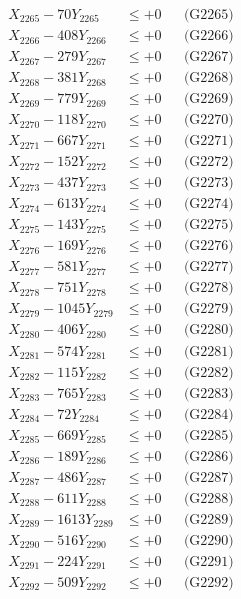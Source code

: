 \documentclass[a4paper,10pt]{article}
\begin{document}
{\begin{align}
X_{2265} - 70Y_{2265} &\leq +0 && \text{(G2265)} \\
X_{2266} - 408Y_{2266} &\leq +0 && \text{(G2266)} \\
X_{2267} - 279Y_{2267} &\leq +0 && \text{(G2267)} \\
X_{2268} - 381Y_{2268} &\leq +0 && \text{(G2268)} \\
X_{2269} - 779Y_{2269} &\leq +0 && \text{(G2269)} \\
X_{2270} - 118Y_{2270} &\leq +0 && \text{(G2270)} \\
\allowbreak
X_{2271} - 667Y_{2271} &\leq +0 && \text{(G2271)} \\
X_{2272} - 152Y_{2272} &\leq +0 && \text{(G2272)} \\
X_{2273} - 437Y_{2273} &\leq +0 && \text{(G2273)} \\
X_{2274} - 613Y_{2274} &\leq +0 && \text{(G2274)} \\
X_{2275} - 143Y_{2275} &\leq +0 && \text{(G2275)} \\
X_{2276} - 169Y_{2276} &\leq +0 && \text{(G2276)} \\
X_{2277} - 581Y_{2277} &\leq +0 && \text{(G2277)} \\
X_{2278} - 751Y_{2278} &\leq +0 && \text{(G2278)} \\
X_{2279} - 1045Y_{2279} &\leq +0 && \text{(G2279)} \\
X_{2280} - 406Y_{2280} &\leq +0 && \text{(G2280)} \\
\allowbreak
X_{2281} - 574Y_{2281} &\leq +0 && \text{(G2281)} \\
X_{2282} - 115Y_{2282} &\leq +0 && \text{(G2282)} \\
X_{2283} - 765Y_{2283} &\leq +0 && \text{(G2283)} \\
X_{2284} - 72Y_{2284} &\leq +0 && \text{(G2284)} \\
X_{2285} - 669Y_{2285} &\leq +0 && \text{(G2285)} \\
X_{2286} - 189Y_{2286} &\leq +0 && \text{(G2286)} \\
X_{2287} - 486Y_{2287} &\leq +0 && \text{(G2287)} \\
X_{2288} - 611Y_{2288} &\leq +0 && \text{(G2288)} \\
X_{2289} - 1613Y_{2289} &\leq +0 && \text{(G2289)} \\
X_{2290} - 516Y_{2290} &\leq +0 && \text{(G2290)} \\
\allowbreak
X_{2291} - 224Y_{2291} &\leq +0 && \text{(G2291)} \\
X_{2292} - 509Y_{2292} &\leq +0 && \text{(G2292)} \\

\end{align}}
\end{document}
